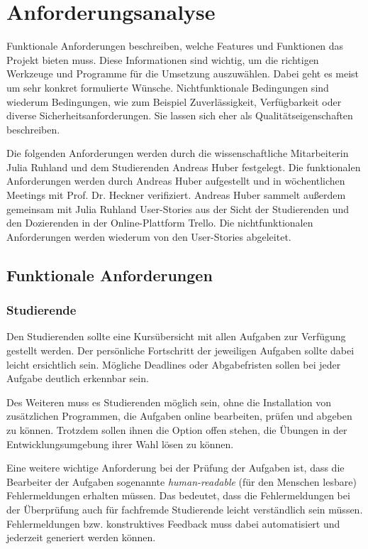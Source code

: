 \section{Anforderungsanalyse}\label{anforderungsanalyse}
Funktionale Anforderungen beschreiben, welche Features und Funktionen das
Projekt bieten muss. Diese Informationen sind wichtig, um die richtigen
Werkzeuge und Programme für die Umsetzung auszuwählen. Dabei geht es meist um
sehr konkret formulierte Wünsche. Nichtfunktionale Bedingungen sind wiederum
Bedingungen, wie zum Beispiel Zuverlässigkeit, Verfügbarkeit oder diverse
Sicherheitsanforderungen. Sie lassen sich eher als Qualitätseigenschaften
beschreiben.

Die folgenden Anforderungen werden durch die wissenschaftliche Mitarbeiterin
Julia Ruhland und dem Studierenden Andreas Huber festgelegt. Die funktionalen
Anforderungen werden durch Andreas Huber aufgestellt und in wöchentlichen
Meetings mit Prof. Dr. Heckner verifiziert. Andreas Huber sammelt außerdem
gemeinsam mit Julia Ruhland User-Stories aus der Sicht der Studierenden und den
Dozierenden in der Online-Plattform Trello. Die nichtfunktionalen Anforderungen
werden wiederum von den User-Stories abgeleitet. %

\subsection{Funktionale Anforderungen}\label{anforderungsanalyse-funktional}
\subsubsection{Studierende}\label{anforderungsanalyse-funktional-stud}
Den Studierenden sollte eine Kursübersicht mit allen Aufgaben zur Verfügung
gestellt werden. Der persönliche Fortschritt der jeweiligen Aufgaben sollte
dabei leicht ersichtlich sein. Mögliche Deadlines oder Abgabefristen sollen bei
jeder Aufgabe deutlich erkennbar sein.

Des Weiteren muss es Studierenden möglich sein, ohne die Installation von
zusätzlichen Programmen, die Aufgaben online bearbeiten, prüfen und abgeben zu
können. Trotzdem sollen ihnen die Option offen stehen, die Übungen in der
Entwicklungsumgebung ihrer Wahl lösen zu können.

Eine weitere wichtige Anforderung bei der Prüfung der Aufgaben ist, dass die
Bearbeiter der Aufgaben sogenannte \emph{human-readable} (für den Menschen
lesbare) Fehlermeldungen erhalten müssen. Das bedeutet, dass die Fehlermeldungen
bei der Überprüfung auch für fachfremde Studierende leicht verständlich sein
müssen. Fehlermeldungen bzw. konstruktives Feedback muss dabei automatisiert und
jederzeit generiert werden können.

